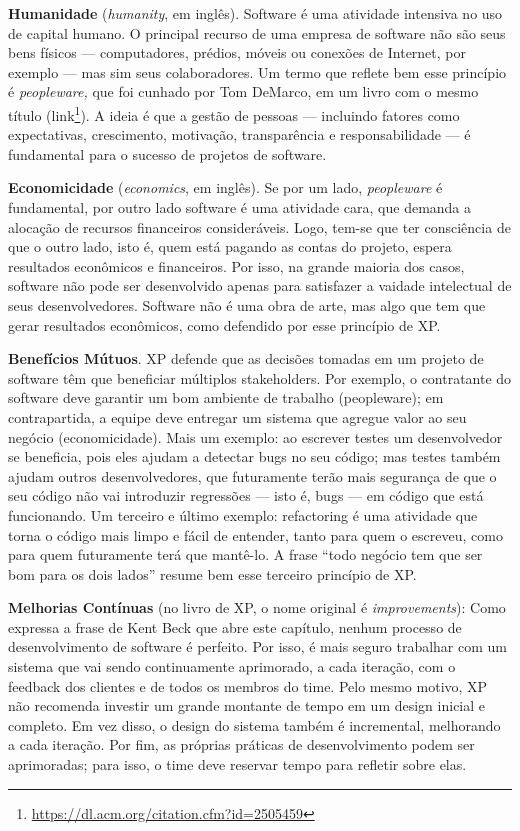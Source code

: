 \documentclass[
  11pt,
  twoside]{book}
\DeclareRobustCommand{\href}[2]{#2\footnote{\url{#1}}}
\begin{document}
\textbf{Humanidade} (\emph{humanity}, em inglês). Software é uma
atividade intensiva no uso de capital humano. O principal recurso de uma
empresa de software não são seus bens físicos --- computadores, prédios,
móveis ou conexões de Internet, por exemplo --- mas sim seus
colaboradores. Um termo que reflete bem esse princípio é
\emph{peopleware,} que foi cunhado por Tom DeMarco, em um livro com o
mesmo título (\href{https://dl.acm.org/citation.cfm?id=2505459}{link}).
A ideia é que a gestão de pessoas --- incluindo fatores como
expectativas, crescimento, motivação, transparência e responsabilidade
--- é fundamental para o sucesso de projetos de software.

\textbf{Economicidade} (\emph{economics}, em inglês). Se por um lado,
\emph{peopleware} é fundamental, por outro lado software é uma atividade
cara, que demanda a alocação de recursos financeiros consideráveis.
Logo, tem-se que ter consciência de que o outro lado, isto é, quem está
pagando as contas do projeto, espera resultados econômicos e
financeiros. Por isso, na grande maioria dos casos, software não pode
ser desenvolvido apenas para satisfazer a vaidade intelectual de seus
desenvolvedores. Software não é uma obra de arte, mas algo que tem que
gerar resultados econômicos, como defendido por esse princípio de XP.

\textbf{Benefícios Mútuos}. XP defende que as decisões tomadas em um
projeto de software têm que beneficiar múltiplos stakeholders. Por
exemplo, o contratante do software deve garantir um bom ambiente de
trabalho (peopleware); em contrapartida, a equipe deve entregar um
sistema que agregue valor ao seu negócio (economicidade). Mais um
exemplo: ao escrever testes um desenvolvedor se beneficia, pois eles
ajudam a detectar bugs no seu código; mas testes também ajudam outros
desenvolvedores, que futuramente terão mais segurança de que o seu
código não vai introduzir regressões --- isto é, bugs --- em código que
está funcionando. Um terceiro e último exemplo: refactoring é uma
atividade que torna o código mais limpo e fácil de entender, tanto para
quem o escreveu, como para quem futuramente terá que mantê-lo. A frase
``todo negócio tem que ser bom para os dois lados'' resume bem esse
terceiro princípio de XP.

\textbf{Melhorias Contínuas} (no livro de XP, o nome original é
\emph{improvements}): Como expressa a frase de Kent Beck que abre este
capítulo, nenhum processo de desenvolvimento de software é perfeito. Por
isso, é mais seguro trabalhar com um sistema que vai sendo continuamente
aprimorado, a cada iteração, com o feedback dos clientes e de todos os
membros do time. Pelo mesmo motivo, XP não recomenda investir um grande
montante de tempo em um design inicial e completo. Em vez disso, o
design do sistema também é incremental, melhorando a cada iteração. Por
fim, as próprias práticas de desenvolvimento podem ser aprimoradas; para
isso, o time deve reservar tempo para refletir sobre elas.
\end{document}
